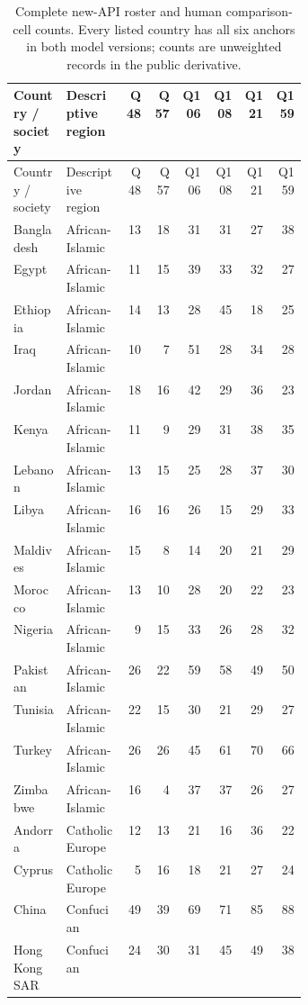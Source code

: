 \begin{longtable}{p{0.18\linewidth}p{0.20\linewidth}rrrrrr}
\caption{Complete new-API roster and human comparison-cell counts. Every listed country has all six anchors in both model versions; counts are unweighted records in the public derivative.}\label{tab:country-roster}\\
\toprule
\rowcolor{tablehead} Country / society & Descriptive region & Q48 & Q57 & Q106 & Q108 & Q121 & Q159 \\
\midrule\endfirsthead
\toprule
\rowcolor{tablehead} Country / society & Descriptive region & Q48 & Q57 & Q106 & Q108 & Q121 & Q159 \\
\midrule\endhead
Bangladesh & African-Islamic & 13 & 18 & 31 & 31 & 27 & 38 \\
Egypt & African-Islamic & 11 & 15 & 39 & 33 & 32 & 27 \\
Ethiopia & African-Islamic & 14 & 13 & 28 & 45 & 18 & 25 \\
Iraq & African-Islamic & 10 & 7 & 51 & 28 & 34 & 28 \\
Jordan & African-Islamic & 18 & 16 & 42 & 29 & 36 & 23 \\
Kenya & African-Islamic & 11 & 9 & 29 & 31 & 38 & 35 \\
Lebanon & African-Islamic & 13 & 15 & 25 & 28 & 37 & 30 \\
Libya & African-Islamic & 16 & 16 & 26 & 15 & 29 & 33 \\
Maldives & African-Islamic & 15 & 8 & 14 & 20 & 21 & 29 \\
Morocco & African-Islamic & 13 & 10 & 28 & 20 & 22 & 23 \\
Nigeria & African-Islamic & 9 & 15 & 33 & 26 & 28 & 32 \\
Pakistan & African-Islamic & 26 & 22 & 59 & 58 & 49 & 50 \\
Tunisia & African-Islamic & 22 & 15 & 30 & 21 & 29 & 27 \\
Turkey & African-Islamic & 26 & 26 & 45 & 61 & 70 & 66 \\
Zimbabwe & African-Islamic & 16 & 4 & 37 & 37 & 26 & 27 \\
\addlinespace[2pt]
Andorra & Catholic Europe & 12 & 13 & 21 & 16 & 36 & 22 \\
Cyprus & Catholic Europe & 5 & 16 & 18 & 21 & 27 & 24 \\
\addlinespace[2pt]
China & Confucian & 49 & 39 & 69 & 71 & 85 & 88 \\
Hong Kong SAR & Confucian & 24 & 30 & 31 & 45 & 49 & 38 \\

\end{longtable}
